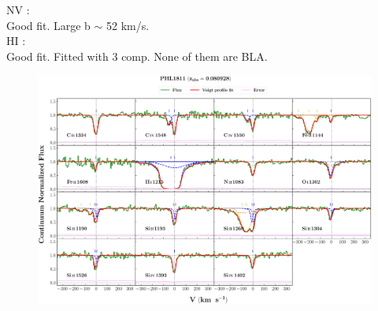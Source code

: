 \documentclass[12pt,draft]{report}
\begin{document}
NV :  \\  \hspace*{1.5cm}
        Good fit. Large b  $\sim$  52 km/s.  \\

HI :  \\  \hspace*{1.5cm}
        Good fit. Fitted with 3 comp. None of them are BLA.  \\



\newpage

\begin{landscape}

\begin{figure}
    \centering
    \vspace{-20mm}
    \hspace*{-35mm}
    \includegraphics[width=1.25\linewidth]{System-Plots/PHL1811_z=0.080928_sys_plot.png}
\end{figure}

\end{landscape}
\end{document}
